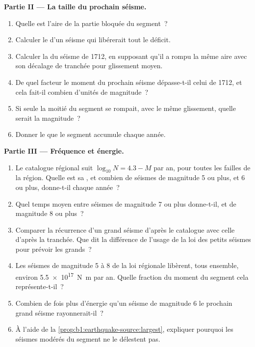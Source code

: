 \begin{problem}
\medskip
\noindent\textbf{Partie II --- La taille du prochain séisme.}
\begin{enumerate}[resume]
  \item Quelle est l'aire de la partie bloquée du segment~?
  \item Calculer le  d'un séisme qui libérerait
        tout le déficit.
  \item Calculer la  du séisme de 1712, en supposant qu'il a rompu
        la même aire avec son décalage de tranchée pour glissement moyen.
  \item De quel facteur le moment du prochain séisme dépasse-t-il celui de
        1712, et cela fait-il combien d'unités de magnitude~?
  \item Si seule la moitié du segment se rompait, avec le même glissement, quelle serait
        la magnitude~?
  \item Donner le  que le segment accumule chaque année.
\end{enumerate}

\medskip
\noindent\textbf{Partie III --- Fréquence et énergie.}
\begin{enumerate}[resume]
  \item Le catalogue régional suit $\log_{10} N = 4.3 - M$ par an, pour
        toutes les failles de la région. Quelle est sa , et combien de
        séismes de magnitude 5 ou plus, et 6 ou plus, donne-t-il chaque
        année~?
  \item Quel temps moyen entre séismes de magnitude 7 ou plus donne-t-il,
        et de magnitude 8 ou plus~?
  \item Comparer la récurrence d'un grand séisme d'après le catalogue avec
        celle d'après la tranchée. Que dit la différence de l'usage de la
        loi des petits séismes pour prévoir les grands~?
  \item Les séismes de magnitude 5 à 8 de la loi régionale libèrent, tous
        ensemble, environ \qty{5.5e17}{N.m} par an. Quelle fraction du moment
        du segment cela représente-t-il~?
  \item Combien de fois plus d'énergie qu'un séisme de magnitude 6 le
        prochain grand séisme rayonnerait-il~?
  \item À l'aide de la \cref{prop:b1:earthquake-source:largest}, expliquer pourquoi les
        séismes modérés du segment ne le délestent pas.
\end{enumerate}


\end{problem}
